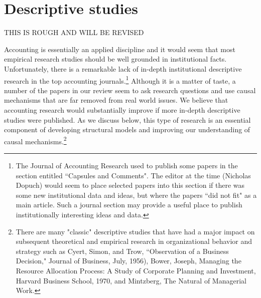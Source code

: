\documentclass[11pt,reqno]{amsart}
\begin{document}


\section{Descriptive studies}

THIS IS ROUGH AND WILL BE REVISED

Accounting is essentially an applied discipline and it would seem that most empirical research studies should be well grounded in institutional facts.
Unfortunately, there is a remarkable lack of in-depth institutional descriptive research in the top accounting journals.\footnote{The Journal of Accounting Research used to publish some papers in the section entitled ``Capsules and Comments". The editor at the time (Nicholas Dopuch) would seem to place selected papers into this section if there was some new institutional data and ideas, but where the papers ``did not fit" as a main article. Such a journal section may provide a useful place to publish institutionally interesting ideas and data.}
Although it is a matter of taste, a number of the papers in our review seem to ask research questions and use causal mechanisms that are far removed from real world issues.
We believe that accounting research would substantially improve if more in-depth descriptive studies were published.
As we discuss below, this type of research is an essential component of developing structural models and improving our understanding of causal mechanisms.\footnote{
There are many "classic" descriptive studies that have had a major impact on subsequent theoretical and empirical research in organizational behavior and strategy such as Cyert, Simon, and Trow, ``Observation of a Business Decision," Journal of Business, July, 1956), Bower, Joseph, Managing the Resource Allocation Process:  A Study of Corporate Planning and Investment, Harvard Business School, 1970, and Mintzberg, The Natural of Managerial Work.}
\end{document}
